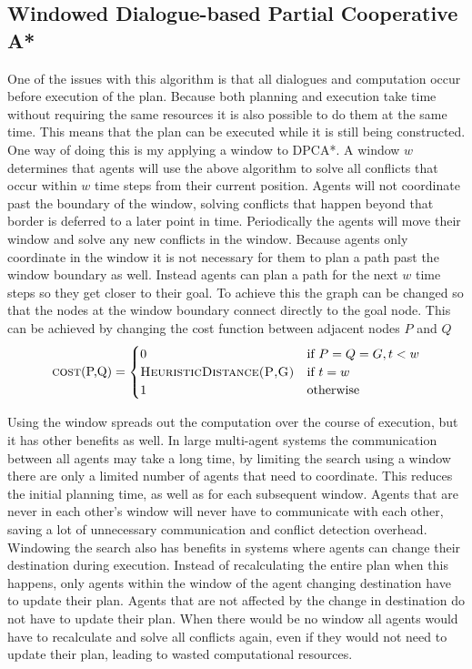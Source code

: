 \subsection{Windowed Dialogue-based Partial Cooperative A*}
One of the issues with this algorithm is that all dialogues and computation
occur before execution of the plan. Because both planning and execution take
time without requiring the same resources it is also possible to do them at the
same time. This means that the plan can be executed while it is still being
constructed. One way of doing this is my applying a window to DPCA*. A
window $w$ determines that agents will use the above algorithm to solve all
conflicts that occur within $w$ time steps from their current position. Agents
will not coordinate past the boundary of the window, solving conflicts that
happen beyond that border is deferred to a later point in time. Periodically
the agents will move their window and solve any new conflicts in the window.
Because agents only coordinate in the window it is not necessary for them to
plan a path past the window boundary as well. Instead agents can plan a path
for the next $w$ time steps so they get closer to their goal. To achieve this
the graph can be changed so that the nodes at the window boundary connect
directly to the goal node. This can be achieved by changing the cost function
between adjacent nodes $P$ and $Q$ \cite{silver2005}
\[
\text{\textsc{cost}(P,Q)} =
\begin{cases}
    0 & \text{if } P = Q = G, t < w \\
    \textsc{HeuristicDistance(P,G)} & \text{if } t = w \\
    1 & \text{otherwise}
\end{cases}
\]

Using the window spreads out the computation over the course of execution, but
it has other benefits as well. In large multi-agent systems the communication
between all agents may take a long time, by limiting the search using a window
there are only a limited number of agents that need to coordinate. This reduces
the initial planning time, as well as for each subsequent window. Agents that
are never in each other's window will never have to communicate with each other,
saving a lot of unnecessary communication and conflict detection overhead.
Windowing the search also has benefits in systems where agents can change their
destination during execution. Instead of recalculating the entire plan when
this happens, only agents within the window of the agent changing destination
have to update their plan. Agents that are not affected by the change in
destination do not have to update their plan. When there would be no window all
agents would have to recalculate and solve all conflicts again, even if they
would not need to update their plan, leading to wasted computational resources.

